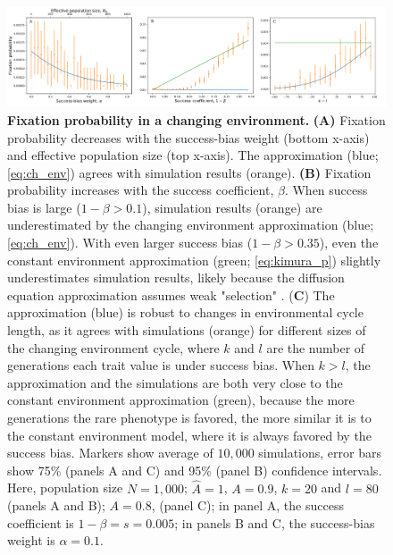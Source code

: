 \documentclass[12pt]{extarticle}
\begin{document}
\begin{figure}[H]
	\centering
    \includegraphics[width=\linewidth]{ch_env.pdf}
  \caption{\textbf{Fixation probability in a changing environment.}
\textbf{(A)} Fixation probability decreases with {the} success-bias weight (bottom x-axis) and effective population size (top x-axis). The approximation (blue; \cref{eq:ch_env}) agrees with simulation results (orange). 
\textbf{(B)} Fixation probability increases with the success coefficient, $\beta$.
When success bias is large ($1-\beta > 0.1$),  
simulation results (orange) are underestimated by the changing environment approximation (blue; \cref{eq:ch_env}). With even larger success bias ($1-\beta > 0.35$), even the constant environment approximation (green; \cref{eq:kimura_p}) slightly underestimates simulation results, likely because the diffusion equation approximation assumes weak "selection" .
(\textbf{C}) The approximation (blue) is robust to changes in environmental cycle length, as it agrees with simulations (orange) for different sizes of the changing environment cycle, where $k$ and $l$ are the number of generations each trait value is under success bias. 
When $k>l$, the approximation and the simulations are both very close to the constant environment approximation (green), because the more generations the rare phenotype is favored, the more similar it is to the constant environment model, where it is always favored by the success bias.
Markers show average of $10,000$ simulations, error bars show 75\% (panels A and C) and 95\% (panel B) confidence intervals.
Here, population size $N=1,000$; $\hat{A}=1$, $A=0.9$, $k=20$ and $l=80$ (panels A and B); $A=0.8$, (panel C); in panel A, the success coefficient is $1-\beta=s=0.005$; in panels B and C, the success-bias weight is $\alpha=0.1$.
  }
  \label{fig:ch_env_alpha_beta}
\end{figure}


\end{document}

